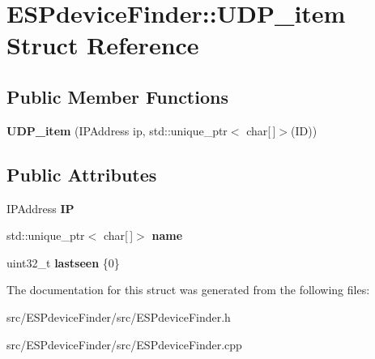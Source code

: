 \hypertarget{struct_e_s_pdevice_finder_1_1_u_d_p__item}{}\section{E\+S\+Pdevice\+Finder\+:\+:U\+D\+P\+\_\+item Struct Reference}
\label{struct_e_s_pdevice_finder_1_1_u_d_p__item}
\subsection*{Public Member Functions}
\begin{DoxyCompactItemize}
\item 
\mbox{\label{struct_e_s_pdevice_finder_1_1_u_d_p__item_a260d0a61d7782a6d8ba0a1d146a71ce1}} 
{\bfseries U\+D\+P\+\_\+item} (I\+P\+Address ip, std\+::unique\+\_\+ptr$<$ char\mbox{[}$\,$\mbox{]}$>$(ID))
\end{DoxyCompactItemize}
\subsection*{Public Attributes}
\begin{DoxyCompactItemize}
\item 
\mbox{\label{struct_e_s_pdevice_finder_1_1_u_d_p__item_a55a4344f5414301dd6acea63982c1771}} 
I\+P\+Address {\bfseries IP}
\item 
\mbox{\label{struct_e_s_pdevice_finder_1_1_u_d_p__item_a25937016f1387c66de6fc1310ddf006d}} 
std\+::unique\+\_\+ptr$<$ char\mbox{[}$\,$\mbox{]}$>$ {\bfseries name}
\item 
\mbox{\label{struct_e_s_pdevice_finder_1_1_u_d_p__item_a2f68508a0b6d46ca91e1354f9de52cfc}} 
uint32\+\_\+t {\bfseries lastseen} \{0\}
\end{DoxyCompactItemize}


The documentation for this struct was generated from the following files\+:\begin{DoxyCompactItemize}
\item 
src/\+E\+S\+Pdevice\+Finder/src/E\+S\+Pdevice\+Finder.\+h\item 
src/\+E\+S\+Pdevice\+Finder/src/E\+S\+Pdevice\+Finder.\+cpp\end{DoxyCompactItemize}
